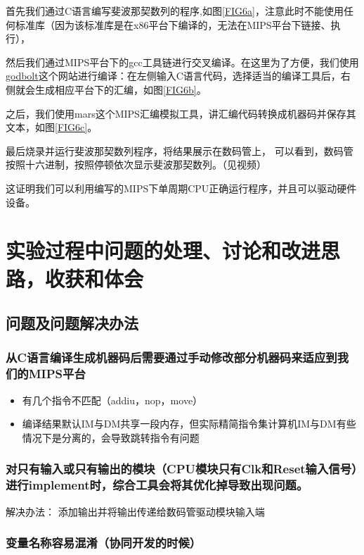 \documentclass[UTF8]{article}
\begin{document}
首先我们通过C语言编写斐波那契数列的程序,如图\ref{FIG6a}，注意此时不能使用任何标准库（因为该标准库是在x86平台下编译的，无法在MIPS平台下链接、执行），

然后我们通过MIPS平台下的gcc工具链进行交叉编译。在这里为了方便，我们使用\href{https://godbolt.org/}{godbolt}这个网站进行编译：在左侧输入C语言代码，选择适当的编译工具后，右侧就会生成相应平台下的汇编，如图\ref{FIG6b}。

之后，我们使用mars这个MIPS汇编模拟工具，讲汇编代码转换成机器码并保存其文本，如图\ref{FIG6c}。

最后烧录并运行斐波那契数列程序，将结果展示在数码管上，
可以看到，数码管按照十六进制，按照停顿依次显示斐波那契数列。（见视频）

这证明我们可以利用编写的MIPS下单周期CPU正确运行程序，并且可以驱动硬件设备。


\section{实验过程中问题的处理、讨论和改进思路，收获和体会}
\subsection{问题及问题解决办法}

\subsubsection{从C语言编译生成机器码后需要通过手动修改部分机器码来适应到我们的MIPS平台}
\begin{itemize}
    \item 有几个指令不匹配（addiu，nop，move）
    \item 编译结果默认IM与DM共享一段内存，但实际精简指令集计算机IM与DM有些情况下是分离的，会导致跳转指令有问题
\end{itemize}

\subsubsection{对只有输入或只有输出的模块（CPU模块只有Clk和Reset输入信号）进行implement时，综合工具会将其优化掉导致出现问题。}
      
解决办法：
添加输出并将输出传递给数码管驱动模块输入端

  
\subsubsection{变量名称容易混淆（协同开发的时候）}
\end{document}
